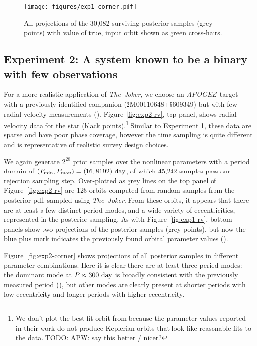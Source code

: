 \documentclass[manuscript, letterpaper]{aastex6}
\newcommand{\project}[1]{\textsl{#1}}
\newcommand{\acronym}[1]{{\small{#1}}}
\newcommand{\apogee}{\project{\acronym{APOGEE}}}
\newcommand{\samplername}{\project{The~Joker}}
\newcommand{\figname}{Figure}
\newcommand{\todo}[1]{{\color{red}TODO: #1}}
\begin{document}
\begin{figure}[p]
\begin{center}
\texttt{[image: figures/exp1-corner.pdf]}
\end{center}
\caption{%
All projections of the 30,082 surviving posterior samples (grey points) with
value of true, input orbit shown as green cross-hairs.
\label{fig:exp1-corner}}
\end{figure}

\subsection{Experiment 2: A system known to be a binary with few observations}

For a more realistic application of \samplername, we choose an \apogee\ target
with a previously identified companion (2M00110648+6609349) but with few radial
velocity measurements (\citealt{Troup:2016}).
\figname~\ref{fig:exp2-rv}, top panel, shows radial velocity data for the star
(black points).\footnote{We don't plot the best-fit orbit from
\citealt{Troup:2016} because the parameter values reported in their work do not
produce Keplerian orbits that look like reasonable fits to the data.
\todo{APW: say this better / nicer?}}
Similar to Experiment 1, these data are sparse and have poor phase coverage,
however the time sampling is quite different and is representative of realistic
survey design choices.

We again generate $2^{28}$ prior samples over the nonlinear parameters with a
period domain of $(P_{\rm min}, P_{\rm max}) = (16, 8192)~{\rm day}$, of which
45,242 samples pass our rejection sampling step.
Over-plotted as grey lines on the top panel of \figname~\ref{fig:exp2-rv} are
128 orbits computed from random samples from the posterior pdf, sampled using
\samplername.
From these orbits, it appears that there are at least a few distinct period
modes, and a wide variety of eccentricities, represented in the posterior
sampling.
As with \figname~\ref{fig:exp1-rv}, bottom panels show two projections of the
posterior samples (grey points), but now the blue plus mark indicates the
previously found orbital parameter values (\citealt{Troup:2016}).

\figname~\ref{fig:exp2-corner} shows projections of all posterior samples in
different parameter combinations.
Here it is clear there are at least three period modes: the dominant mode at $P
\approx 300~{\rm day}$ is broadly consistent with the previously measured period
(\citealt{Troup:2016}), but other modes are clearly present at shorter periods
with low eccentricity and longer periods with higher eccentricity.
\end{document}
